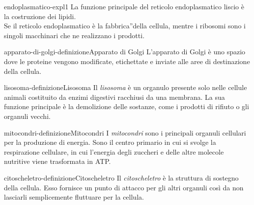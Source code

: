 \documentclass[preview]{standalone}
\begin{document}
\begin{snippet}{endoplasmatico-expl1}
    La funzione principale del reticolo endoplasmatico liscio è
    la costruzione dei lipidi.\\
    Se il reticolo endoplasmatico è la fabbrica”della cellula, mentre i ribosomi sono i singoli macchinari che ne
    realizzano i prodotti.
\end{snippet}

\begin{snippetdefinition}{apparato-di-golgi-definizione}{Apparato di Golgi}
    L'apparato di Golgi è uno spazio dove le proteine
    vengono modificate, etichettate e inviate alle aree di destinazione della cellula.
\end{snippetdefinition}


\begin{snippetdefinition}{lisosoma-definizione}{Lisosoma}
    Il \textit{lisosoma} è un organulo presente solo nelle cellule animali costituito da enzimi digestivi
    racchiusi da una membrana.
    La sua funzione principale è la demolizione delle sostanze,
    come i prodotti di rifiuto o gli organuli vecchi.
\end{snippetdefinition}

\begin{snippetdefinition}{mitocondri-definizione}{Mitocondri}
    I \textit{mitocondri} sono i principali organuli cellulari per la produzione di energia.
    Sono il centro primario in cui si svolge la respirazione cellulare, in cui l'energia degli
    zuccheri e delle altre
    molecole nutritive viene trasformata in ATP.
\end{snippetdefinition}


\begin{snippetdefinition}{citoscheletro-definizione}{Citoscheletro}
    Il \textit{citoscheletro} è la struttura di sostegno della cellula.
    Esso fornisce un punto di attacco per gli altri organuli così da non 
    lasciarli semplicemente fluttuare per la cellula.
\end{snippetdefinition}

\end{document}
